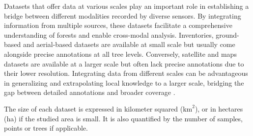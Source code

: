 \documentclass{CUP-JNL-DTM}%
\theoremstyle{definition}
\numberwithin{equation}{section}
\begin{document}
Datasets that offer data at various scales play an important role in establishing a bridge between different modalities recorded by diverse sensors. 
By integrating information from multiple sources, these datasets facilitate a comprehensive understanding of forests and enable cross-modal analysis.
%
%
Inventories, ground-based and aerial-based datasets are available at small scale but usually come alongside precise annotations at all tree levels.
Conversely, satellite and maps datasets are available at a larger scale but often lack precise annotations due to their lower resolution. 
Integrating data from different scales can be advantageous in generalizing and extrapolating local knowledge to a larger scale, bridging the gap between detailed annotations and broader coverage \cite{kattenborn_uav_2019, schiefer_uav-based_2023}.


The size of each dataset is expressed in kilometer squared ($\text{km}^2$), or in hectares (ha) if the studied area is small. It is also quantified by the number of samples, points or trees if applicable.
\end{document}
